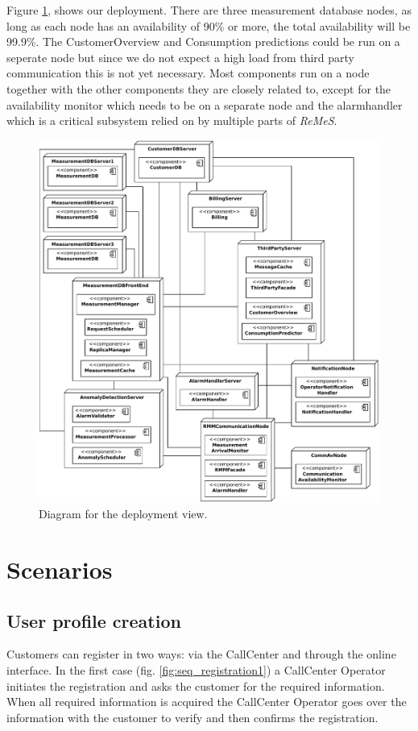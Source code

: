 \documentclass[a4paper,10pt]{article}
\newcommand{\rem}{\emph{ReMeS}\xspace}
\begin{document}
Figure \ref{fig:depl_primary}, shows our deployment.
There are three measurement database nodes, as long as each node has an availability of 90\% or more, the total availability will be 99.9\%. The CustomerOverview and Consumption predictions could be run on a seperate node but since we do not expect a high load from third party communication this is not yet necessary. Most components run on a node together with the other components they are closely related to, except for the availability monitor which needs to be on a separate node and the alarmhandler which is a critical subsystem relied on by multiple parts of \rem.

\begin{figure}[!htp]
    \centering
    \includegraphics[width=\textwidth]{Deployment_Diagram}
    \caption{Diagram for the deployment view.}\label{fig:depl_primary}
\end{figure}

\section{Scenarios}\label{sec:scenarios}

\subsection{User profile creation}
Customers can register in two ways: via the CallCenter and through the online interface.
In the first case (fig. \ref{fig:seq_registration1}) a CallCenter Operator initiates the registration and asks the customer for the required information.
When all required information is acquired the CallCenter Operator goes over the information with the customer to verify and then confirms the registration.
\end{document}

